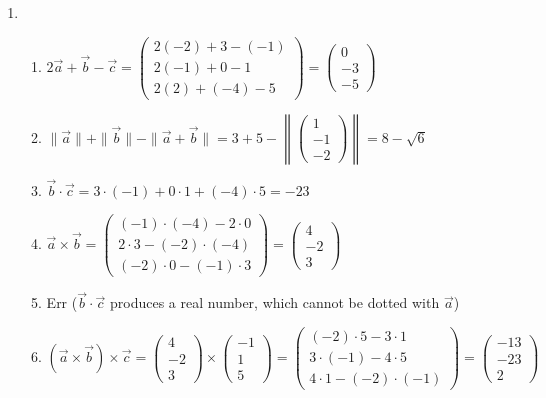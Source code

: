 \begin{enumerate}
\item \begin{enumerate}
\item $2\vec{a} + \vec{b} - \vec{c} = \begin{pmatrix} 2(-2) + 3 - (-1) \\ 2(-1) + 0 - 1 \\ 2(2) + (-4) - 5 \end{pmatrix} = \begin{pmatrix} 0 \\ -3 \\ -5 \end{pmatrix}$
\item $\|\vec{a}\| + \|\vec{b}\| - \|\vec{a} + \vec{b}\| = 3 + 5 - \left\|\begin{pmatrix} 1 \\ -1 \\ -2 \end{pmatrix}\right\| = 8 - \sqrt{6}$
\item $\vec{b}\cdot\vec{c} = 3\cdot (-1) + 0\cdot 1 + (-4)\cdot 5 = -23$
\item $\vec{a}\times\vec{b} = \begin{pmatrix} (-1)\cdot (-4) - 2\cdot 0 \\ 2\cdot 3 - (-2)\cdot (-4) \\ (-2)\cdot 0 - (-1)\cdot 3 \end{pmatrix} = \begin{pmatrix} 4 \\ -2 \\ 3 \end{pmatrix}$
\item Err ($\vec{b}\cdot\vec{c}$ produces a real number, which cannot be dotted with $\vec{a}$)
\item $(\vec{a}\times\vec{b})\times\vec{c} = \begin{pmatrix} 4 \\ -2 \\ 3 \end{pmatrix}\times\begin{pmatrix} -1 \\ 1 \\ 5 \end{pmatrix} = \begin{pmatrix} (-2)\cdot 5 - 3\cdot 1 \\ 3\cdot (-1) - 4\cdot 5 \\ 4\cdot 1 - (-2)\cdot (-1) \end{pmatrix} = \begin{pmatrix} -13 \\ -23 \\ 2 \end{pmatrix}$

\end{enumerate}
\end{enumerate}
